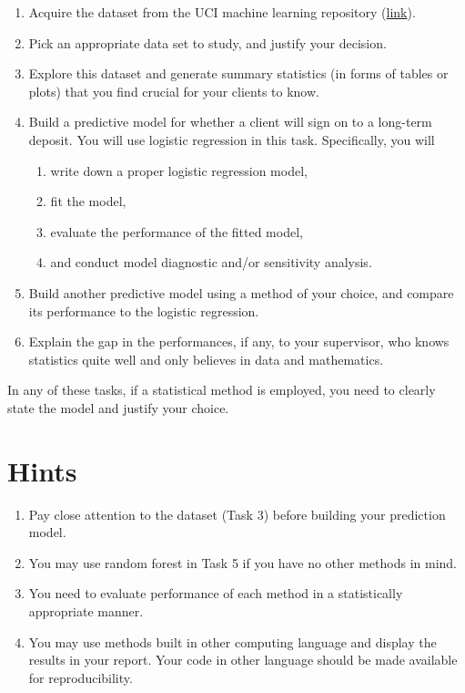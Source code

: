 \documentclass[12pt,]{book}
\providecommand{\tightlist}{%
  \setlength{\itemsep}{0pt}\setlength{\parskip}{0pt}}
\begin{document}
\begin{enumerate}
\def\labelenumi{\arabic{enumi}.}
\tightlist
\item
  Acquire the dataset from the UCI machine learning repository
  (\href{https://archive.ics.uci.edu/ml/datasets/Bank+Marketing\#}{link}).
\item
  Pick an appropriate data set to study, and justify your decision.
\item
  Explore this dataset and generate summary statistics (in forms of
  tables or plots) that you find crucial for your clients to know.
\item
  Build a predictive model for whether a client will sign on to a
  long-term deposit. You will use logistic regression in this task.
  Specifically, you will

  \begin{enumerate}
  \def\labelenumii{\alph{enumii}.}
  \tightlist
  \item
    write down a proper logistic regression model,
  \item
    fit the model,
  \item
    evaluate the performance of the fitted model,
  \item
    and conduct model diagnostic and/or sensitivity analysis.
  \end{enumerate}
\item
  Build another predictive model using a method of your choice, and
  compare its performance to the logistic regression.
\item
  Explain the gap in the performances, if any, to your supervisor, who
  knows statistics quite well and only believes in data and mathematics.
\end{enumerate}

In any of these tasks, if a statistical method is employed, you need to
clearly state the model and justify your choice.

\section{Hints}\label{hints-1}

\begin{enumerate}
\def\labelenumi{\arabic{enumi}.}
\tightlist
\item
  Pay close attention to the dataset (Task 3) before building your
  prediction model.
\item
  You may use random forest in Task 5 if you have no other methods in
  mind.
\item
  You need to evaluate performance of each method in a statistically
  appropriate manner.
\item
  You may use methods built in other computing language and display the
  results in your report. Your code in other language should be made
  available for reproducibility.
\end{enumerate}


\end{document}
